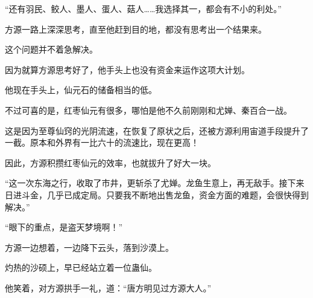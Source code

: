 \begin{this_body}
“还有羽民、鲛人、墨人、蛋人、菇人……我选择其一，都会有不小的利处。”

方源一路上深深思考，直至他赶到目的地，都没有思考出一个结果来。

这个问题并不着急解决。

因为就算方源思考好了，他手头上也没有资金来运作这项大计划。

他现在手头上，仙元石的储备相当的低。

不过可喜的是，红枣仙元有很多，哪怕是他不久前刚刚和尤婵、秦百合一战。

这是因为至尊仙窍的光阴流速，在恢复了原状之后，还被方源利用宙道手段提升了一截。原本和外界有一比六十的流速比，现在更高！

因此，方源积攒红枣仙元的效率，也就拔升了好大一块。

“这一次东海之行，收取了市井，更斩杀了尤婵。龙鱼生意上，再无敌手。接下来日进斗金，几乎已成定局。只要我不断地出售龙鱼，资金方面的难题，会很快得到解决。”

“眼下的重点，是盗天梦境啊！”

方源一边想着，一边降下云头，落到沙漠上。

灼热的沙硕上，早已经站立着一位蛊仙。

他笑着，对方源拱手一礼，道：“唐方明见过方源大人。”

\end{this_body}

